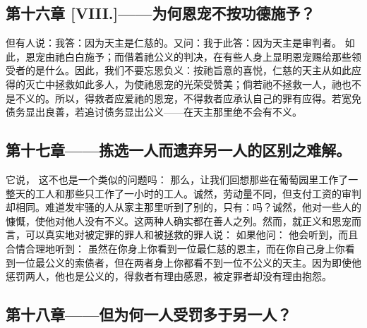
\subsection{第十六章 [VIII.]——为何恩宠不按功德施予？}

但有人说：我答：因为天主是仁慈的。又问：我于此答：因为天主是审判者。 如此，恩宠由祂白白施予；而借着祂公义的判决，在有些人身上显明恩宠赐给那些领受者的是什么。因此，我们不要忘恩负义：按祂旨意的喜悦，仁慈的天主从如此应得的灭亡中拯救如此多人，为使祂恩宠的光荣受赞美；倘若祂不拯救一人，祂也不是不义的。所以，得救者应爱祂的恩宠，不得救者应承认自己的罪有应得。若宽免债务显出良善，若追讨债务显出公义——在天主那里绝不会有不义。\par


\subsection{第十七章——拣选一人而遗弃另一人的区别之难解。}

它说， 这不也是一个类似的问题吗： 那么，让我们回想那些在葡萄园里工作了一整天的工人和那些只工作了一小时的工人。诚然，劳动量不同，但支付工资的审判却相同。难道发牢骚的人从家主那里听到了别的，只有：吗？诚然，他对一些人的慷慨，使他对他人没有不义。这两种人确实都在善人之列。然而，就正义和恩宠而言，可以真实地对被定罪的罪人和被拯救的罪人说： 如果他问： 他会听到，而且合情合理地听到： 虽然在你身上你看到一位最仁慈的恩主，而在你自己身上你看到一位最公义的索债者，但在两者身上你都看不到一位不公义的天主。因为即使他惩罚两人，他也是公义的，得救者有理由感恩，被定罪者却没有理由抱怨。\par


\subsection{第十八章——但为何一人受罚多于另一人？}

